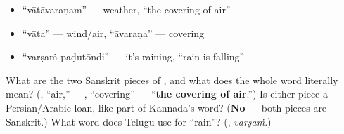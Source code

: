 \begin{itemize}
\raggedright
  \item \textquotedblleft{}vātāvaraṇam\textquotedblright{} — weather, \textquotedblleft{}the covering of air\textquotedblright{}
  \item \textquotedblleft{}vāta\textquotedblright{} — wind/air, \textquotedblleft{}āvaraṇa\textquotedblright{} — covering
  \item \textquotedblleft{}varṣaṁ paḍutōndi\textquotedblright{} — it's raining, \textquotedblleft{}rain is falling\textquotedblright{}
\end{itemize}

\begin{tcolorbox}[breakable,colback=teal!4,colframe=teal!35!black,title={Before you move on}]
What are the two Sanskrit pieces of \textbf{}, and what does the whole word literally mean? (\textbf{}, \textquotedblleft{}air,\textquotedblright{} + \textbf{}, \textquotedblleft{}covering\textquotedblright{} — \textquotedblleft{}\textbf{the covering of air}.\textquotedblright{}) Is either piece a Persian/Arabic loan, like part of Kannada's word? (\textbf{No} — both pieces are Sanskrit.) What word does Telugu use for \textquotedblleft{}rain\textquotedblright{}? (\textbf{}, \emph{varṣaṁ}.)
\end{tcolorbox}
